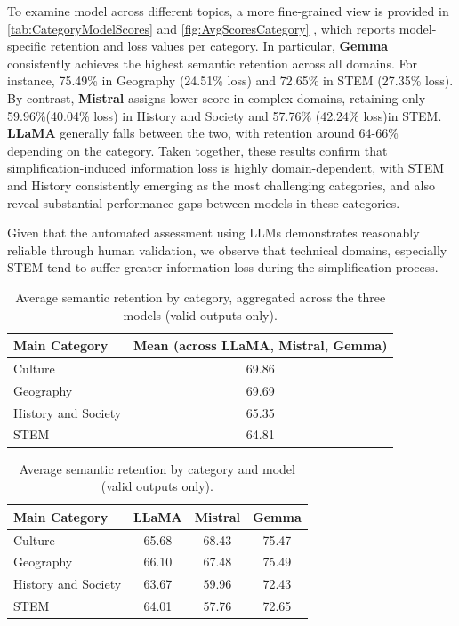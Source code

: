 \documentclass{DESSThesis}
\begin{document}
To examine model across different topics, a more fine-grained view is provided in \autoref{tab:CategoryModelScores} and \autoref{fig:AvgScoresCategory} , which reports model-specific retention and loss values per category. In particular, \textbf{Gemma} consistently achieves the highest semantic retention across all domains. For instance, 75.49\% in Geography (24.51\% loss) and 72.65\% in STEM (27.35\% loss). By contrast, \textbf{Mistral} assigns lower score in complex domains, retaining only 59.96\%(40.04\% loss)  in History and Society and 57.76\% (42.24\% loss)in STEM. \textbf{LLaMA} generally falls between the two, with retention around 64-66\% depending on the category. Taken together, these results confirm that simplification-induced information loss is highly domain-dependent, with STEM and History consistently emerging as the most challenging categories, and also reveal substantial performance gaps between models in these categories.  

Given that the automated assessment using LLMs demonstrates reasonably reliable through human validation, we observe that technical domains, especially STEM tend to suffer greater information loss during the simplification process.

\begin{table}[H]
\centering
\caption{Average semantic retention by category, aggregated across the three models (valid outputs only).}
\label{tab:AvgCategoryScores}
\begin{tabular}{lc}
\toprule
Main Category & Mean (across LLaMA, Mistral, Gemma) \\
\midrule
Culture                & 69.86 \\
Geography              & 69.69 \\
History and Society    & 65.35 \\
STEM                   & 64.81 \\
\bottomrule
\end{tabular}
\end{table}

\begin{table}[H]
\centering
\caption{Average semantic retention by category and model (valid outputs only).}
\label{tab:CategoryModelScores}
\begin{tabular}{lccc}
\toprule
Main Category & LLaMA & Mistral & Gemma \\
\midrule
Culture                & 65.68 & 68.43 & 75.47 \\
Geography              & 66.10 & 67.48 & 75.49 \\
History and Society    & 63.67 & 59.96 & 72.43 \\
STEM                   & 64.01 & 57.76 & 72.65 \\
\bottomrule
\end{tabular}
\end{table}
\end{document}
